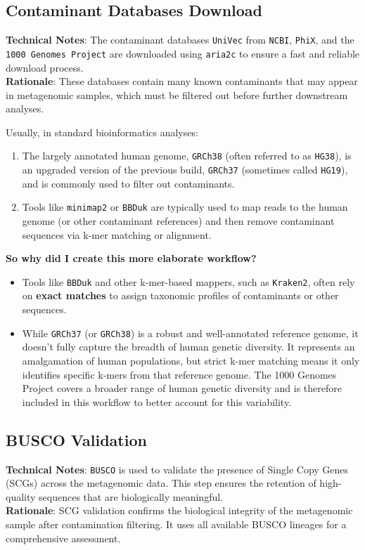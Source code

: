\documentclass[11pt]{report}
\begin{document}
{\subsection{Contaminant Databases Download} \textbf{Technical Notes}: The contaminant databases \texttt{UniVec} from \texttt{NCBI}, \texttt{PhiX}, and the \texttt{1000 Genomes Project} are downloaded using \texttt{aria2c} to ensure a fast and reliable download process.\\ \textbf{Rationale}: These databases contain many  known contaminants that may appear in metagenomic samples, which must be filtered out before further downstream analyses.

\begin{tcolorbox}[coltitle=white, title=Personal Notes]
	Usually, in standard bioinformatics analyses:
	\begin{enumerate}
		\item The largely annotated human genome, \texttt{GRCh38} (often referred to as \texttt{HG38}), is an upgraded version of the previous build, \texttt{GRCh37} (sometimes called \texttt{HG19}), and is commonly used to filter out contaminants.
		\item Tools like \texttt{minimap2} or \texttt{BBDuk} are typically used to map reads to the human genome (or other contaminant references) and then remove contaminant sequences via k-mer matching or alignment.
	\end{enumerate}
	\textbf{So why did I create this more elaborate workflow?}
	\begin{itemize}
		\item Tools like \texttt{BBDuk} and other k-mer-based mappers, such as \texttt{Kraken2}, often rely on \textbf{exact matches} to assign taxonomic profiles of contaminants or other sequences.
		\item While \texttt{GRCh37} (or \texttt{GRCh38}) is a robust and well-annotated reference genome, it doesn't fully capture the breadth of human genetic diversity. It represents an amalgamation of human populations, but strict k-mer matching means it only identifies specific k-mers from that reference genome. The 1000 Genomes Project covers a broader range of human genetic diversity and is therefore included in this workflow to better account for this variability.
	\end{itemize}
\end{tcolorbox}



\subsection{BUSCO Validation} \textbf{Technical Notes}: \texttt{BUSCO} is used to validate the presence of Single Copy Genes (SCGs) across the metagenomic data. This step ensures the retention of high-quality sequences that are biologically meaningful.\\
\textbf{Rationale}: SCG validation confirms the biological integrity of the metagenomic sample after contamination filtering. It uses all available BUSCO lineages for a comprehensive assessment. 

}
\end{document}
